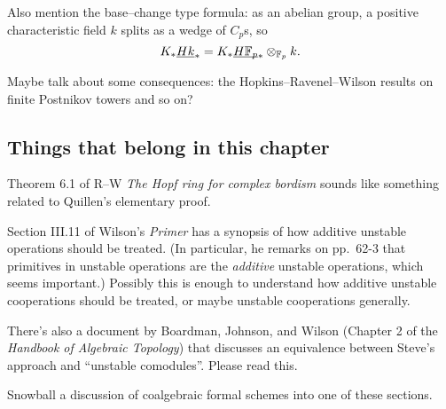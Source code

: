 \begin{remark}
Also mention the base--change type formula: as an abelian group, a positive characteristic field $k$ splits as a wedge of $C_p$s, so \[K_* \underline{\smash{Hk}}_{*} = K_* \underline{\smash{H\mathbb F_p}}_{*} \otimes_{\mathbb F_p} k.\]
\end{remark}





Maybe talk about some consequences: the Hopkins--Ravenel--Wilson results on finite Postnikov towers and so on?








\subsection*{Things that belong in this chapter}

Theorem 6.1 of R--W \textit{The Hopf ring for complex bordism} sounds like something related to Quillen's elementary proof.

Section III.11 of Wilson's \textit{Primer} has a synopsis of how additive unstable operations should be treated.  (In particular, he remarks on pp.\ 62-3 that primitives in unstable operations are the \emph{additive} unstable operations, which seems important.)  Possibly this is enough to understand how additive unstable cooperations should be treated, or maybe unstable cooperations generally.

There's also a document by Boardman, Johnson, and Wilson (Chapter 2 of the \textit{Handbook of Algebraic Topology}) that discusses an equivalence between Steve's approach and ``unstable comodules''.  Please read this.

Snowball a discussion of coalgebraic formal schemes into one of these sections.





